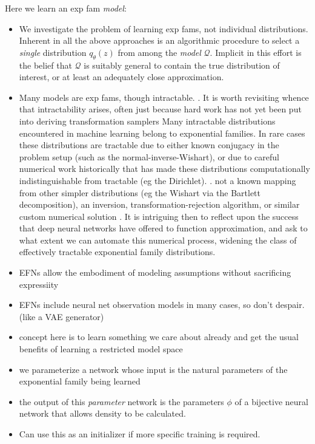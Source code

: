 \documentclass{article}
\begin{document}
Here we learn an exp fam \emph{model}:
\begin{itemize}

\item We investigate the problem of learning exp fams, not individual distributions.  Inherent in all the above approaches is an algorithmic procedure to select a \emph{single} distribution $q_\theta(z)$ from among the \emph{model} $\mathcal{Q}$.  Implicit in this effort is the belief that $\mathcal{Q}$ is suitably general to contain the true distribution of interest, or at least an adequately close approximation.

\item Many models are exp fams, though intractable.  \cite{wainwright2008graphical}.   It is worth revisiting whence that intractability arises, often just because hard work has not yet been put into deriving transformation samplers Many intractable distributions encountered in machine learning belong to exponential families.  In rare cases these distributions are tractable due to either known conjugacy in the problem setup (such as the normal-inverse-Wishart), or due to careful numerical work historically that has made these distributions computationally indistinguishable from tractable (eg the Dirichlet). \cite{Devroye:1986aa}.  not a known mapping from other simpler distributions (eg the Wishart via the Bartlett decomposition), an inversion, transformation-rejection algorithm, or similar custom numerical solution \cite{Devroye:1986aa}.  It is intriguing then to reflect upon the success that deep neural networks have offered to function approximation, and ask to what extent we can automate this numerical process, widening the class of effectively tractable exponential family distributions.
\item EFNs allow the embodiment of modeling assumptions without sacrificing expressiity
\item EFNs include neural net observation models in many cases, so don't despair. (like a VAE generator)
\item concept here is to learn something we care about already and get the usual benefits of learning a restricted model space \cite[\S7, for example]{friedman2001elements}
\item we parameterize a network whose input is the natural parameters of the exponential family being learned
\item the output of this \emph{parameter} network is the parameters $\phi$ of a bijective neural network that allows density to be calculated.  
\item Can use this as an initializer if more specific training is required.
\end{itemize}
\end{document}
